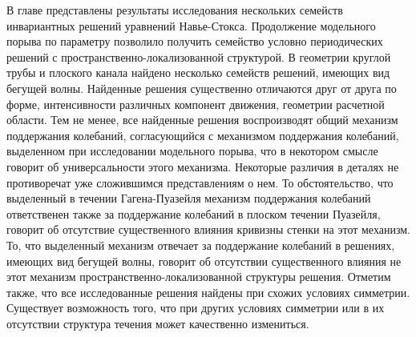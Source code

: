 В главе представлены результаты исследования нескольких семейств инвариантных решений уравнений Навье-Стокса. Продолжение модельного порыва по параметру позволило получить семейство условно периодических решений с пространственно-локализованной структурой. В геометрии круглой трубы и плоского канала найдено несколько семейств решений, имеющих вид бегущей волны. Найденные решения существенно отличаются друг от друга по форме, интенсивности различных компонент движения, геометрии расчетной области. Тем не менее, все найденные решения воспроизводят общий механизм поддержания колебаний, согласующийся с механизмом поддержания колебаний, выделенном при исследовании модельного порыва, что в некотором смысле говорит об универсальности этого механизма. Некоторые различия в деталях не противоречат уже сложившимся представлениям о нем. То обстоятельство, что выделенный в течении Гагена-Пуазейля механизм поддержания колебаний ответственен также за поддержание колебаний в плоском течении Пуазейля, говорит об отсутствие существенного влияния кривизны стенки на этот механизм. То, что выделенный механизм отвечает за поддержание колебаний в решениях, имеющих вид бегущей волны, говорит об отсутствии существенного влияния не этот механизм пространственно-локализованной структуры решения. Отметим также, что все исследованные решения найдены при схожих условиях симметрии. Существует возможность того, что при других условиях симметрии или в их отсутствии структура течения может качественно измениться.







